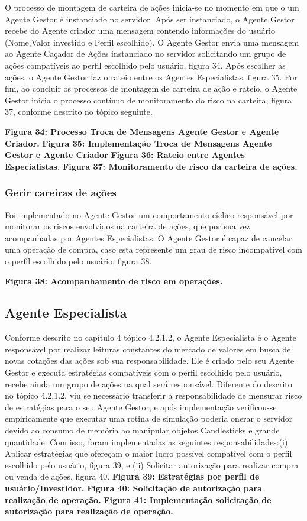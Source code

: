 O processo de montagem de carteira de ações inicia-se no momento em que o um Agente Gestor é instanciado no servidor. Após ser instanciado, o Agente Gestor recebe do Agente criador uma mensagem contendo informações do usuário (Nome,Valor investido e Perfil escolhido). O Agente Gestor envia uma mensagem ao Agente Caçador de Ações instanciado no servidor solicitando um grupo de ações compatíveis ao perfil escolhido pelo usuário, figura 34. Após escolher as ações, o Agente Gestor faz o rateio entre os Agentes Especialistas, figura 35. Por fim, ao concluir os processos de montagem de carteira de ação e rateio, o Agente Gestor inicia o processo contínuo de monitoramento do risco na carteira, figura 37, conforme descrito no tópico seguinte.

\textbf{Figura 34: Processo Troca de Mensagens Agente Gestor e Agente Criador.}
\textbf{Figura 35: Implementação Troca de Mensagens Agente Gestor e Agente Criador}
\textbf{Figura 36: Rateio entre Agentes Especialistas.}
\textbf{Figura 37: Monitoramento de risco da carteira de ações.}

\subsubsection{Gerir careiras de ações}
Foi implementado no Agente Gestor um comportamento cíclico responsável por monitorar os riscos envolvidos na carteira de ações, que por sua vez acompanhadas por Agentes Especialistas. O Agente Gestor é capaz de cancelar uma operação de compra, caso esta represente um grau de risco incompatível com o perfil escolhido pelo usuário, figura 38.

\textbf{Figura 38: Acompanhamento de risco em operações.}

\subsection{Agente Especialista}

Conforme descrito no capítulo 4 tópico 4.2.1.2, o Agente Especialista é o Agente responsável por realizar leituras constantes do mercado de valores em busca de novas cotações das ações sob sua responsabilidade. Ele é criado pelo seu Agente Gestor e executa estratégias compatíveis com o perfil escolhido pelo usuário, recebe ainda um grupo de ações na qual será responsável. Diferente do descrito no tópico 4.2.1.2, viu se necessário transferir a responsabilidade de mensurar risco de estratégias para o seu Agente Gestor, e após implementação verificou-se empiricamente que executar uma rotina de simulação poderia onerar o servidor devido ao consumo de memória ao manipular objetos Candlesticks e grande quantidade. Com isso, foram implementadas as seguintes responsabilidades:(i) Aplicar estratégias que ofereçam o maior lucro possível compatível com o perfil escolhido pelo usuário, figura 39; e (ii) Solicitar autorização para realizar compra ou venda de ações, figura 40.
\textbf{Figura 39: Estratégias por perfil de usuário/Investidor.}
\textbf{Figura 40: Solicitação de autorização para realização de operação.}
\textbf{Figura 41:  Implementação solicitação de autorização para realização de operação.}

